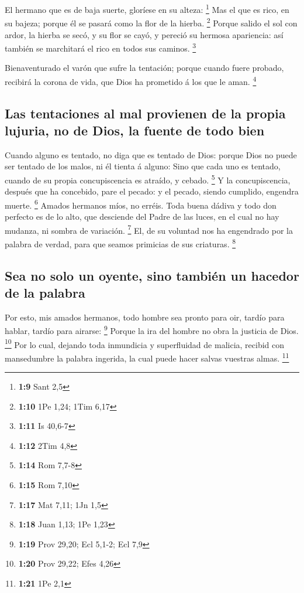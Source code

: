  El hermano que es de baja suerte, gloríese en su alteza:
\footnote{\textbf{1:9} Sant 2,5}  Mas el que es rico, en
su bajeza; porque él se pasará como la flor de la hierba. \footnote{\textbf{1:10}
  1Pe 1,24; 1Tim 6,17}  Porque salido el sol con ardor,
la hierba se secó, y su flor se cayó, y pereció su hermosa apariencia:
así también se marchitará el rico en todos sus caminos. \footnote{\textbf{1:11}
  Is 40,6-7}

 Bienaventurado el varón que sufre la tentación; porque
cuando fuere probado, recibirá la corona de vida, que Dios ha prometido
á los que le aman. \footnote{\textbf{1:12} 2Tim 4,8}

\hypertarget{las-tentaciones-al-mal-provienen-de-la-propia-lujuria-no-de-dios-la-fuente-de-todo-bien}{%
\subsection{Las tentaciones al mal provienen de la propia lujuria, no de
Dios, la fuente de todo
bien}\label{las-tentaciones-al-mal-provienen-de-la-propia-lujuria-no-de-dios-la-fuente-de-todo-bien}}

 Cuando alguno es tentado, no diga que es tentado de
Dios: porque Dios no puede ser tentado de los malos, ni él tienta á
alguno:  Sino que cada uno es tentado, cuando de su
propia concupiscencia es atraído, y cebado. \footnote{\textbf{1:14} Rom
  7,7-8}  Y la concupiscencia, después que ha concebido,
pare el pecado: y el pecado, siendo cumplido, engendra muerte.
\footnote{\textbf{1:15} Rom 7,10}  Amados hermanos míos,
no erréis.  Toda buena dádiva y todo don perfecto es de
lo alto, que desciende del Padre de las luces, en el cual no hay
mudanza, ni sombra de variación. \footnote{\textbf{1:17} Mat 7,11; 1Jn
  1,5}  El, de su voluntad nos ha engendrado por la
palabra de verdad, para que seamos primicias de sus criaturas.
\footnote{\textbf{1:18} Juan 1,13; 1Pe 1,23}

\hypertarget{sea-no-solo-un-oyente-sino-tambiuxe9n-un-hacedor-de-la-palabra}{%
\subsection{Sea no solo un oyente, sino también un hacedor de la
palabra}\label{sea-no-solo-un-oyente-sino-tambiuxe9n-un-hacedor-de-la-palabra}}

 Por esto, mis amados hermanos, todo hombre sea pronto
para oir, tardío para hablar, tardío para airarse: \footnote{\textbf{1:19}
  Prov 29,20; Ecl 5,1-2; Ecl 7,9}  Porque la ira del
hombre no obra la justicia de Dios. \footnote{\textbf{1:20} Prov 29,22;
  Efes 4,26}  Por lo cual, dejando toda inmundicia y
superfluidad de malicia, recibid con mansedumbre la palabra ingerida, la
cual puede hacer salvas vuestras almas. \footnote{\textbf{1:21} 1Pe 2,1}

